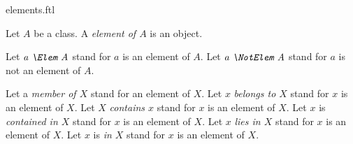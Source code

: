 \documentclass{stex}
\begin{document}
\begin{smodule}{elements.ftl}



\begin{fakeforthel}
  \begin{signature}
    Let $A$ be a class.
    A \emph{element of $A$} is an object.

    Let $\emph{a \Elem A}$ stand for $a$ is an element of $A$.
    Let $\emph{a \NotElem A}$ stand for $a$ is not an element of $A$.
  \end{signature}
\end{fakeforthel}

\begin{forthel}
  \begin{convention}
    Let a \emph{member of $X$} stand for an element of $X$.
    Let $x$ \emph{belongs to $X$} stand for $x$ is an element of $X$.
    Let $X$ \emph{contains $x$} stand for $x$ is an element of $X$.
    Let $x$ is \emph{contained in $X$} stand for $x$ is an element of $X$.
    Let $x$ \emph{lies in $X$} stand for $x$ is an element of $X$.
    Let $x$ is \emph{in $X$} stand for $x$ is an element of $X$.
  \end{convention}
\end{forthel}

\end{smodule}
\end{document}
